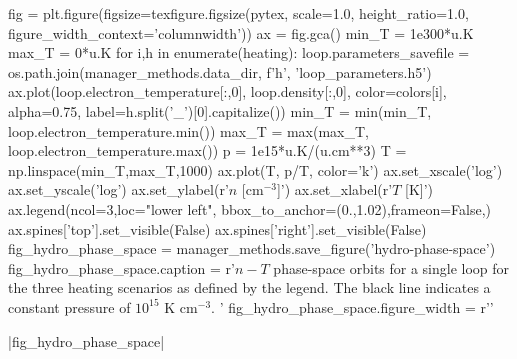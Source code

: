 \begin{pycode}
fig = plt.figure(figsize=texfigure.figsize(pytex, scale=1.0, height_ratio=1.0, 
                                           figure_width_context='columnwidth'))
ax = fig.gca()
min_T = 1e300*u.K
max_T = 0*u.K
for i,h in enumerate(heating):
    loop.parameters_savefile = os.path.join(manager_methods.data_dir, f'{h}', 'loop_parameters.h5')
    ax.plot(loop.electron_temperature[:,0], loop.density[:,0], color=colors[i], alpha=0.75,
            label=h.split('_')[0].capitalize())
    min_T = min(min_T, loop.electron_temperature.min())
    max_T = max(max_T, loop.electron_temperature.max())
p = 1e15*u.K/(u.cm**3)
T = np.linspace(min_T,max_T,1000)
ax.plot(T, p/T, color='k')
ax.set_xscale('log')
ax.set_yscale('log')
ax.set_ylabel(r'$n$ [cm$^{-3}$]')
ax.set_xlabel(r'$T$ [K]')
ax.legend(ncol=3,loc="lower left", bbox_to_anchor=(0.,1.02),frameon=False,)
ax.spines['top'].set_visible(False)
ax.spines['right'].set_visible(False)
fig_hydro_phase_space = manager_methods.save_figure('hydro-phase-space')
fig_hydro_phase_space.caption = r'$n-T$ phase-space orbits for a single loop for the three heating scenarios as defined by the legend. The black line indicates a constant pressure of $10^{15}$ K cm$^{-3}$. '
fig_hydro_phase_space.figure_width = r'\columnwidth'
\end{pycode}
|fig_hydro_phase_space|

